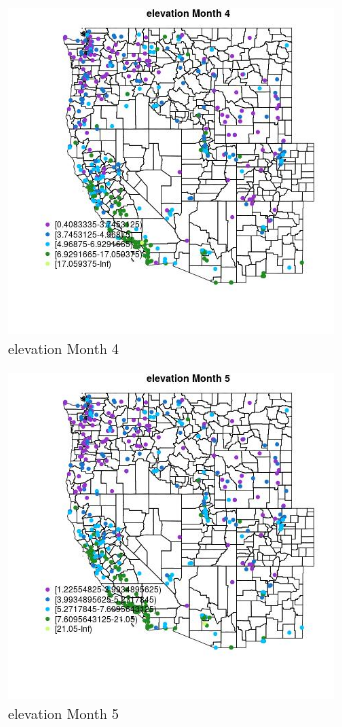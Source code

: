 \clearpage 

\begin{figure} 
\centering  
\includegraphics[width=0.77\textwidth]{Code_Outputs/ML_input_report_ML_input_PM25_Step5_part_d_de_duplicated_aves_ML_input_MapObsMo4elevation.jpg} 
\caption{\label{fig:ML_input_report_ML_input_PM25_Step5_part_d_de_duplicated_aves_ML_inputMapObsMo4elevation}elevation Month 4} 
\end{figure} 
 

\begin{figure} 
\centering  
\includegraphics[width=0.77\textwidth]{Code_Outputs/ML_input_report_ML_input_PM25_Step5_part_d_de_duplicated_aves_ML_input_MapObsMo5elevation.jpg} 
\caption{\label{fig:ML_input_report_ML_input_PM25_Step5_part_d_de_duplicated_aves_ML_inputMapObsMo5elevation}elevation Month 5} 
\end{figure} 
 

